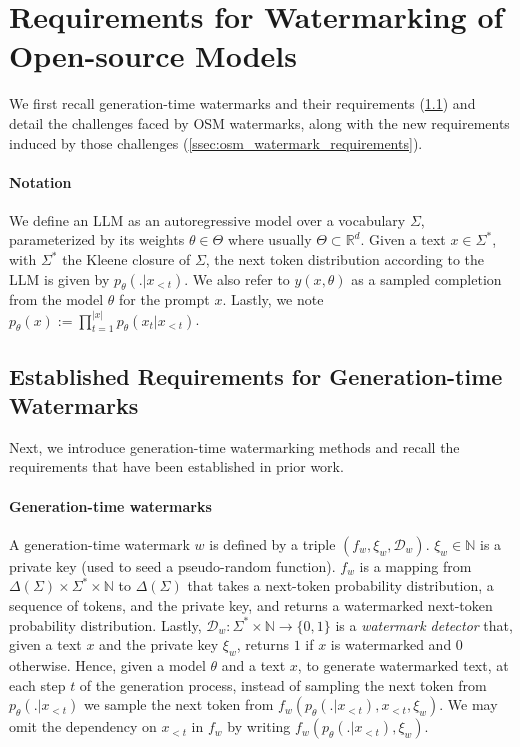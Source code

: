 \section{Requirements for Watermarking of Open-source Models}
\label{sec:requirements}

We first recall generation-time watermarks and their requirements (\cref{ssec:requirements_post_hoc}) and detail the challenges faced by OSM watermarks, along with the new requirements induced by those challenges (\cref{ssec:osm_watermark_requirements}).

\paragraph{Notation}
We define an LLM as an autoregressive model over a vocabulary $\Sigma$, parameterized by its weights $\theta \in \Theta$ where usually $\Theta \subset \mathbb{R}^d$.
Given a text $x \in \Sigma^*$, with $\Sigma^*$ the Kleene closure of $\Sigma$, the next token distribution according to the LLM is given by $p_{\theta}(.|x_{<t})$. 
We also refer to $y(x, \theta)$ as a sampled completion from the model $\theta$ for the prompt $x$.
Lastly, we note $p_{\theta}(x):= \prod_{t=1}^{|x|} p_{\theta}(x_t|x_{<t})$.

\subsection{Established Requirements for Generation-time Watermarks}
\label{ssec:requirements_post_hoc}

Next, we introduce generation-time watermarking methods and recall the requirements that have been established in prior work.

\paragraph{Generation-time watermarks} 
A generation-time watermark $w$ is defined by a triple $(f_w, \xi_w, \mathcal{D}_w)$. 
$\xi_w \in \mathbb{N}$ is a private key (used to seed a pseudo-random function).
$f_w$ is a mapping from $\Delta(\Sigma) \times \Sigma^* \times \mathbb{N}$ to $\Delta(\Sigma)$ that takes a next-token probability distribution, a sequence of tokens, and the private key, and returns a watermarked next-token probability distribution.
Lastly, $\mathcal{D}_w: \Sigma^* \times \mathbb{N} \rightarrow \{0,1\}$ is a \emph{watermark detector} that, given a text $x$ and the private key $\xi_w$, returns $1$ if $x$ is watermarked and $0$ otherwise. 
Hence, given a model $\theta$ and a text $x$, to generate watermarked text, at each step $t$ of the generation process, instead of sampling the next token from $p_{\theta}(.|x_{<t})$ we sample the next token from $f_w(p_{\theta}(.|x_{<t}), x_{<t}, \xi_w)$.
We may omit the dependency on $x_{<t}$ in $f_w$ by writing $f_w(p_{\theta}(.|x_{<t}), \xi_w)$.

